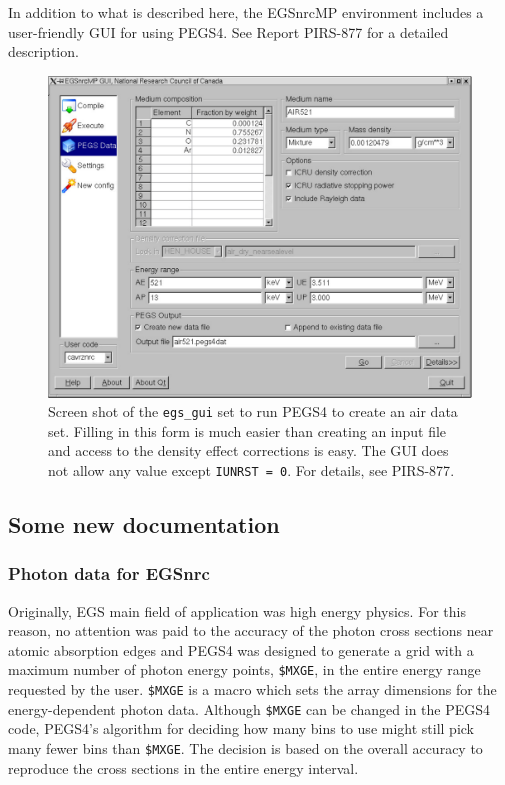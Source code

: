 In addition to what is described here, the EGSnrcMP environment includes
a user-friendly GUI for using PEGS4. See Report PIRS-877\cite{Ka03}
for a detailed description.
\begin{figure}[ht]
   \begin{center}
   \includegraphics[width=12cm]{figures/egs_gui_pegs4_screen}
    \end{center}
   \caption{Screen shot of the {\tt egs\_gui} set to run PEGS4 to create
an air data set. Filling in this form is much easier than creating an input
file and access to the density effect corrections is easy. The GUI
does not allow any value except {\tt IUNRST = 0}. For details, see
PIRS-877\cite{Ka03}. }
   \label{fig_pegs4_screen}
\end{figure}

\subsection{Some new documentation}

\subsubsection{Photon data for EGSnrc}
\label{xsections}
Originally, EGS main field of application was high energy physics.
For this reason, no attention was paid to the accuracy of the
photon cross sections near atomic absorption edges\cite{RB90} and
PEGS4 was designed to generate a grid with a maximum number of photon
energy points, {\tt \$MXGE}, in the entire energy range requested by the user.
{\tt \$MXGE} is a macro which sets the array dimensions for the energy-dependent
photon data. Although {\tt \$MXGE} can be changed in the PEGS4 code,
PEGS4's algorithm for deciding how many bins to use might still pick many
fewer bins than {\tt \$MXGE}. The decision is based on the overall accuracy to
reproduce the cross sections in the entire energy interval.

